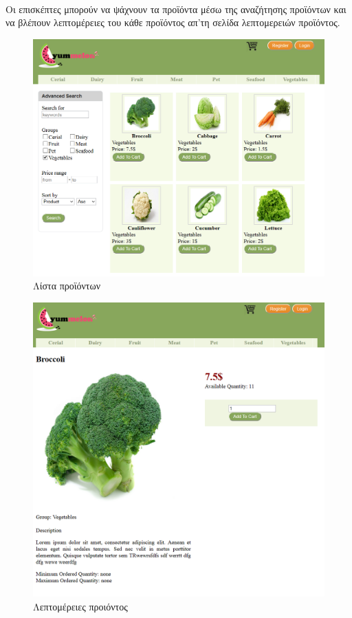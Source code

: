 \documentclass[12pt]{article}
\begin{document}
	  	 \paragraph{}
	  	 	Οι επισκέπτες μπορούν να ψάχνουν τα προϊόντα μέσω της αναζήτησης προϊόντων και να βλέπουν λεπτομέρειες του κάθε προϊόντος απ'τη σελίδα λεπτομερειών προϊόντος.
			\begin{figure}[H]
				\centering
				\includegraphics[width=1\textwidth]{productList}
				\caption{Λίστα προϊόντων}
			\end{figure}
			\begin{figure}[H]
				\centering
				\includegraphics[width=1\textwidth]{productDetails}
				\caption{Λεπτομέρειες προιόντος}
			\end{figure}	  
\end{document}

